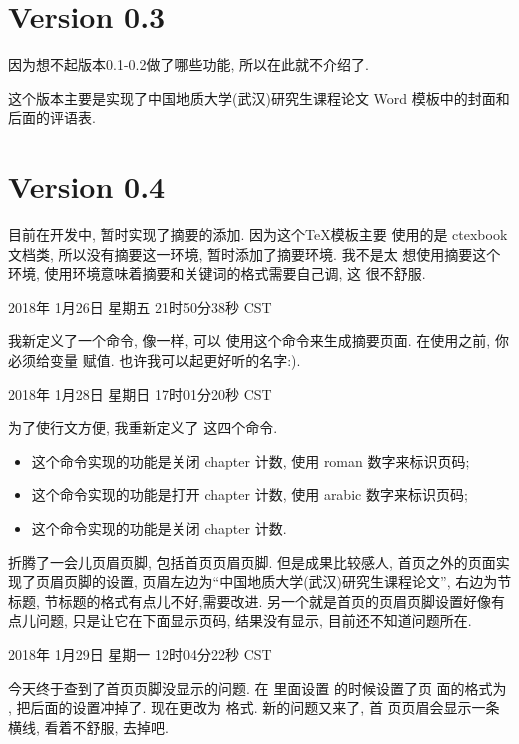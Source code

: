 \documentclass{cugrep}
\begin{document}
\section{Version 0.3}
\label{sec:version_0_3}
因为想不起版本0.1-0.2做了哪些功能, 所以在此就不介绍了.

这个版本主要是实现了中国地质大学(武汉)研究生课程论文 Word 模板中的封面和后面的评语表.
\section{Version 0.4}
\label{sec:version_0_4}

目前在开发中, 暂时实现了摘要的添加. 因为这个\TeX{}模板主要 使用的是
ctexbook 文档类, 所以没有摘要这一环境, 暂时添加了摘要环境. 我不是太
想使用摘要这个环境, 使用环境意味着摘要和关键词的格式需要自己调, 这
很不舒服.

2018年 1月26日 星期五 21时50分38秒 CST

我新定义了一个命令, 像一样, 可以
使用这个命令来生成摘要页面. 在使用之前, 你必须给变量 赋值. 也许我可以起更好听的名字:).

2018年 1月28日 星期日 17时01分20秒 CST

为了使行文方便, 我重新定义了 这四个命令. 

\begin{itemize}
    \item {} 这个命令实现的功能是关闭 chapter 计数, 使用 roman 数字来标识页码;
    \item {} 这个命令实现的功能是打开 chapter 计数, 使用 arabic 数字来标识页码;
    \item {} 这个命令实现的功能是关闭 chapter 计数.
\end{itemize}

折腾了一会儿页眉页脚, 包括首页页眉页脚. 但是成果比较感人, 首页之外的页面实现了页眉页脚的设置,
页眉左边为``中国地质大学(武汉)研究生课程论文'', 右边为节标题, 节标题的格式有点儿不好,需要改进.
另一个就是首页的页眉页脚设置好像有点儿问题, 只是让它在下面显示页码, 结果没有显示, 目前还不知道问题所在. 

2018年 1月29日 星期一 12时04分22秒 CST

今天终于查到了首页页脚没显示的问题. 在  里面设置  的时候设置了页
面的格式为 , 把后面的设置冲掉了. 现在更改为  格式. 新的问题又来了, 首
页页眉会显示一条横线, 看着不舒服, 去掉吧. 
\end{document}
